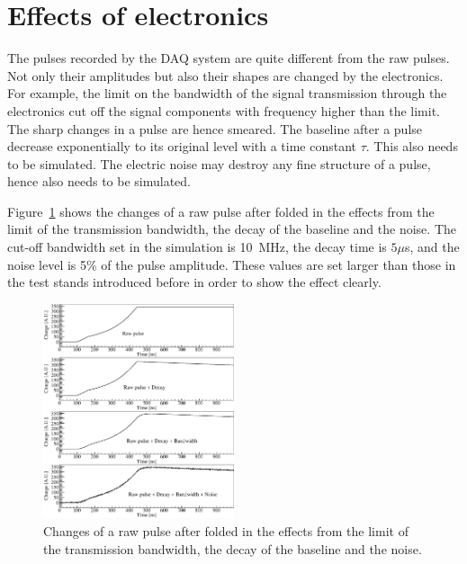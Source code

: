 \section{Effects of electronics}
\label{sec:pss:elec}
The pulses recorded by the DAQ system are quite different from the raw pulses. Not only their amplitudes but also their shapes are changed by the electronics. For example, the limit on the bandwidth of the signal transmission through the electronics cut off the signal components with frequency higher than the limit. The sharp changes in a pulse are hence smeared. The baseline after a pulse decrease exponentially to its original level with a time constant $\tau$. This also needs to be simulated. The electric noise may destroy any fine structure of a pulse, hence also needs to be simulated.

Figure~\ref{fig:pss:elec} shows the changes of a raw pulse after folded in the effects from the limit of the transmission bandwidth, the decay of the baseline and the noise. The cut-off bandwidth set in the simulation is 10~MHz, the decay time is $5 \mu$s, and the noise level is 5\% of the pulse amplitude. These values are set larger than those in the test stands introduced before in order to show the effect clearly.
\begin{figure}
\centering
\includegraphics[width=0.5\textwidth]{PSDBN}
\caption{Changes of a raw pulse after folded in the effects from the limit of the transmission bandwidth, the decay of the baseline and the noise.}
\label{fig:pss:elec}
\end{figure}


